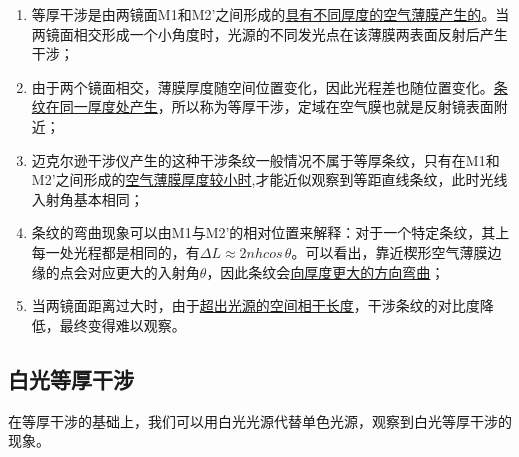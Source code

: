 \documentclass[12pt]{article}
\begin{document}
\begin{enumerate}
    \item 等厚干涉是由两镜面M1和M2'之间形成的\underline{具有不同厚度的空气薄膜产生的}。当两镜面相交形成一个小角度时，光源的不同发光点在该薄膜两表面反射后产生干涉；
    \item 由于两个镜面相交，薄膜厚度随空间位置变化，因此光程差也随位置变化。\underline{条纹在同一厚度处产生}，所以称为等厚干涉，定域在空气膜也就是反射镜表面附近；
    \item 迈克尔逊干涉仪产生的这种干涉条纹一般情况不属于等厚条纹，只有在M1和M2'之间形成的\underline{空气薄膜厚度较小时},才能近似观察到等距直线条纹，此时光线入射角基本相同；
    \item 条纹的弯曲现象可以由M1与M2'的相对位置来解释：对于一个特定条纹，其上每一处光程都是相同的，有$\Delta L\approx 2nhcos\,\theta$。可以看出，靠近楔形空气薄膜边缘的点会对应更大的入射角$\theta$，因此条纹会\underline{向厚度更大的方向弯曲}；
    \item 当两镜面距离过大时，由于\underline{超出光源的空间相干长度}，干涉条纹的对比度降低，最终变得难以观察。
\end{enumerate}
\subsection{白光等厚干涉}
\quad 在等厚干涉的基础上，我们可以用白光光源代替单色光源，观察到白光等厚干涉的现象。
\end{document}
